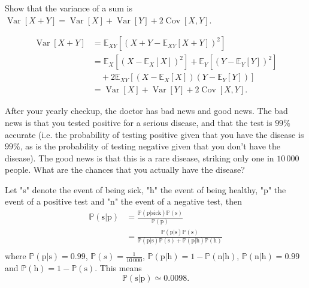 \begin{example}
	Show that the variance of a sum is $\operatorname{Var}[X+Y]=\operatorname{Var}[X]+\operatorname{Var}[Y]+2\operatorname{Cov}[X,Y]$.
	
	\begin{equation}
		\begin{split}
			\operatorname{Var}[X+Y] &= \mathbb{E}_{XY}[(X+Y-\mathbb{E}_{XY}[X+Y])^2]\\
			&= \mathbb{E}_X[(X-\mathbb{E}_X[X])^2]+\mathbb{E}_Y[(Y-\mathbb{E}_Y[Y])^2]\\
			&\quad+2\mathbb{E}_{XY}[(X-\mathbb{E}_X[X])(Y-\mathbb{E}_Y[Y])]\\
			& = \operatorname{Var}[X]+\operatorname{Var}[Y]+2\operatorname{Cov}[X,Y].
		\end{split}
	\end{equation}
\end{example}
\begin{example}
	After your yearly checkup, the doctor has bad news and good news. The bad news is that you tested positive for a serious disease, and that the test is $99\%$ accurate (i.e. the probability of testing positive given that you have the disease is $99\%$, as is the probability of testing negative given that you don't have the disease). The good news is that this is a rare disease, striking only one in $10\,000$ people. What are the chances that you actually have the disease?\newline
	
	Let "s" denote the event of being sick, "h" the event of being healthy, "p" the event of a positive test and "n" the event of a negative test, then  
	\begin{equation}
		\begin{split}
			\mathbb{P}(\text{s}|\text{p}) &= \frac{\mathbb{P}(\text{p}|\text{sick})\mathbb{P}(\text{s})}{\mathbb{P}(\text{p})}\\
			&= \frac{\mathbb{P}(\text{p}|\text{s})\mathbb{P}(\text{s})}{\mathbb{P}(\text{p}|\text{s})\mathbb{P}(\text{s})+\mathbb{P}(\text{p}|\text{h})\mathbb{P}(\text{h})}\\
		\end{split}
	\end{equation}
	where $\mathbb{P}(\text{p}|\text{s}) = 0.99$, $\mathbb{P}(s) = \frac{1}{10\, 000}$, $\mathbb{P}(\text{p}|\text{h})=1-\mathbb{P}(\text{n}|\text{h})$, $\mathbb{P}(\text{n}|\text{h})=0.99$ and $\mathbb{P}(\text{h})=1-\mathbb{P}(\text{s})$. This means
	\begin{equation}
		\mathbb{P}(\text{s}|\text{p}) \simeq 0.0098.
	\end{equation}		
\end{example}

